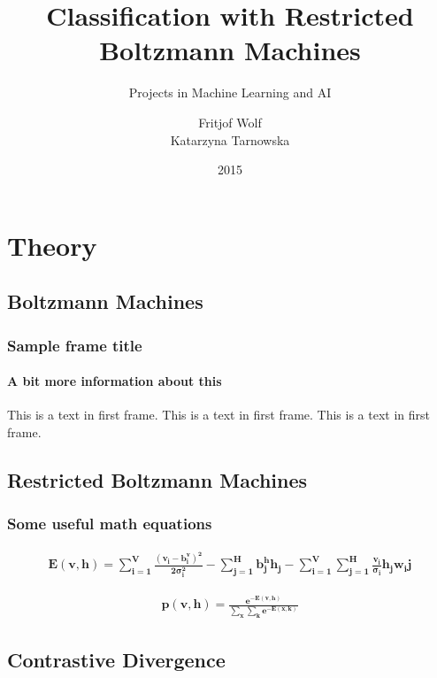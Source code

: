 \documentclass{beamer}
\title{Classification with Restricted Boltzmann Machines}
\subtitle{Projects in Machine Learning and AI}
\author{Fritjof Wolf \\ Katarzyna Tarnowska}
\institute{Technische Universitat Berlin}
\date{2015}
\begin{document}
  
  \begin{frame}[plain]
    \titlepage
  \end{frame}
  \section{Theory}
  \subsection{Boltzmann Machines} 
  \begin{frame}
    \frametitle{Sample frame title}
    \framesubtitle{A bit more information about this}
    This is a text in first frame. This is a text in first frame. This is a text in first frame.
  \end{frame}
  \subsection{Restricted Boltzmann Machines}
  \begin{frame}
  \frametitle{Some useful math equations}
  \begin{align}
      \mathbf{E(v,h) = \sum_{i=1}^{V} \frac{(v_i - b_i^v)^2}{2\sigma_i^2} - \sum_{j=1}^{H} b_j^h h_j - \sum_{i=1}^{V} \sum_    {j=1}^{H} \frac{v_i}{\sigma_i} h_j w_ij}
  \end{align}

  \begin{align}
      \mathbf{p(v,h) = \frac{e^{-E(v,h)}}{\sum_x \sum_k e^{-E(x,k)}}}
  \end{align}
  \end{frame}
  \subsection{Contrastive Divergence} 
\end{document}
